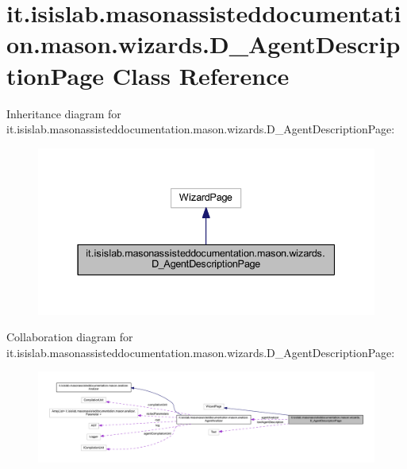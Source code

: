 \hypertarget{classit_1_1isislab_1_1masonassisteddocumentation_1_1mason_1_1wizards_1_1_d___agent_description_page}{\section{it.\-isislab.\-masonassisteddocumentation.\-mason.\-wizards.\-D\-\_\-\-Agent\-Description\-Page Class Reference}
\label{classit_1_1isislab_1_1masonassisteddocumentation_1_1mason_1_1wizards_1_1_d___agent_description_page}
}


Inheritance diagram for it.\-isislab.\-masonassisteddocumentation.\-mason.\-wizards.\-D\-\_\-\-Agent\-Description\-Page\-:\nopagebreak
\begin{figure}[H]
\begin{center}
\leavevmode
\includegraphics[width=337pt]{classit_1_1isislab_1_1masonassisteddocumentation_1_1mason_1_1wizards_1_1_d___agent_description_page__inherit__graph}
\end{center}
\end{figure}


Collaboration diagram for it.\-isislab.\-masonassisteddocumentation.\-mason.\-wizards.\-D\-\_\-\-Agent\-Description\-Page\-:\nopagebreak
\begin{figure}[H]
\begin{center}
\leavevmode
\includegraphics[width=350pt]{classit_1_1isislab_1_1masonassisteddocumentation_1_1mason_1_1wizards_1_1_d___agent_description_page__coll__graph}
\end{center}
\end{figure}
